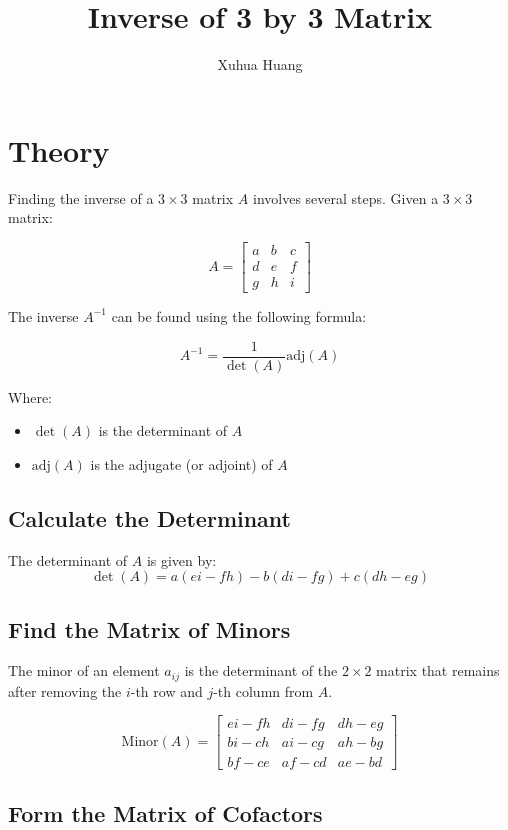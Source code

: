 \documentclass{article}
\title{Inverse of 3 by 3  Matrix}
\author{Xuhua Huang}
\begin{document}
\maketitle

\section{Theory}
Finding the inverse of a \(3 \times 3\) matrix \(A\) involves several steps. Given a \(3 \times 3\) matrix:

\[
A = \begin{bmatrix}
a & b & c \\
d & e & f \\
g & h & i
\end{bmatrix}
\]

The inverse \(A^{-1}\) can be found using the following formula:

\[
A^{-1} = \frac{1}{\det(A)} \text{adj}(A)
\]

Where:
\begin{itemize}
  \item {\(\det(A)\) is the determinant of \(A\)}
  \item {\(\text{adj}(A)\) is the adjugate (or adjoint) of \(A\)}
\end{itemize}

\subsection{Calculate the Determinant}

   The determinant of \(A\) is given by:
   \[
   \det(A) = a(ei - fh) - b(di - fg) + c(dh - eg)
   \]

\subsection{Find the Matrix of Minors}

   The minor of an element \(a_{ij}\) is the determinant of the \(2 \times 2\) matrix that remains after removing the \(i\)-th row and \(j\)-th column from \(A\).

   \[
   \text{Minor}(A) = \begin{bmatrix}
   ei - fh & di - fg & dh - eg \\
   bi - ch & ai - cg & ah - bg \\
   bf - ce & af - cd & ae - bd
   \end{bmatrix}
   \]

\subsection{Form the Matrix of Cofactors}
\end{document}
